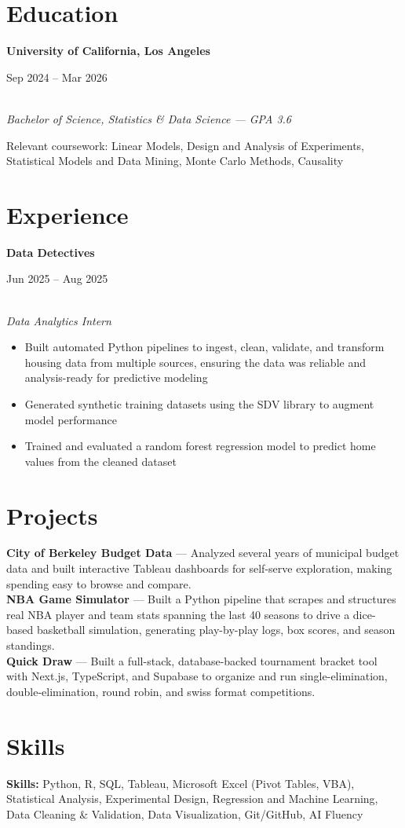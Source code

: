 \documentclass[11pt,letterpaper]{article}
\newcommand{\entry}[3]{%
  \noindent\begin{minipage}[t]{0.72\textwidth}\raggedright\textbf{#1}\end{minipage}%
  \hfill\begin{minipage}[t]{0.26\textwidth}\raggedleft\small\color{gray}#2\end{minipage}\\
  \textit{#3}\par\vspace{2pt}
}
\begin{document}


\vspace{4pt}

\section*{Education}
\entry{University of California, Los Angeles}{Sep 2024 -- Mar 2026}{Bachelor of Science, Statistics \& Data Science --- GPA 3.6}
\small Relevant coursework: Linear Models, Design and Analysis of Experiments, Statistical Models and Data Mining, Monte Carlo Methods, Causality

\section*{Experience}



\entry{Data Detectives}{Jun 2025 -- Aug 2025}{Data Analytics Intern}
\begin{itemize}
  \item Built automated Python pipelines to ingest, clean, validate, and transform housing data from multiple sources, ensuring the data was reliable and analysis-ready for predictive modeling
  \item Generated synthetic training datasets using the SDV library to augment model performance
  \item Trained and evaluated a random forest regression model to predict home values from the cleaned dataset
\end{itemize}



\section*{Projects}
\textbf{City of Berkeley Budget Data} --- Analyzed several years of municipal budget data and built interactive Tableau dashboards for self-serve exploration, making spending easy to browse and compare.\\[4pt]
\textbf{NBA Game Simulator} --- Built a Python pipeline that scrapes and structures real NBA player and team stats spanning the last 40 seasons to drive a dice-based basketball simulation, generating play-by-play logs, box scores, and season standings.\\[4pt]
\textbf{Quick Draw} --- Built a full-stack, database-backed tournament bracket tool with Next.js, TypeScript, and Supabase to organize and run single-elimination, double-elimination, round robin, and swiss format competitions.

\section*{Skills}
\textbf{Skills:} Python, R, SQL, Tableau, Microsoft Excel (Pivot Tables, VBA), Statistical Analysis, Experimental Design, Regression and Machine Learning, Data Cleaning \& Validation, Data Visualization, Git/GitHub, AI Fluency
\end{document}
